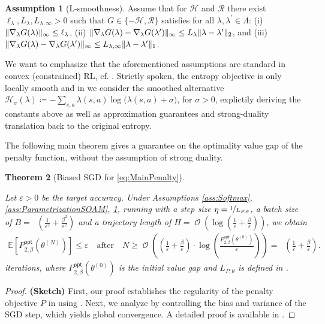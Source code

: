 \documentclass{article}
\theoremstyle{plain}
\newtheorem{theorem}{Theorem}[section]
\theoremstyle{definition}
\newtheorem{assumption}[theorem]{Assumption}
\theoremstyle{remark}
\DeclareMathOperator{\OOTildeSym}{\widetilde{\mathcal{O}}}
\DeclareMathOperator{\OOSym}{\mathcal{O}}
\newcommand{\OOTilde}[1]{{\OOTildeSym\!\left(#1\right)}}
\newcommand{\OO}[1]{{\OOSym\!\left(#1\right)}}
\def\epsilon{{\varepsilon}}
\newcommand{\Exp}[1]{{ \mathbb{E}}\!\left[#1\right]}
\DeclarePairedDelimiter{\norm}{\lVert}{\rVert}
\newcommand{\define}{\coloneqq}
\def\xx{{\theta}}
\def\xxZero{\xx^{(0)}}
\def\xxN{\xx^{(N)}}
\def\optLabel{\mathsf{opt}}
\newcommand{\penOpt}[1]{P^\optLabel_{#1}}
\def\ss{{s}}
\def\HH{{\mathcal{H}}}
\def\aa{{a}}
\def\ss{{s}}
\def\Reg{{\mathcal{R}}}
\begin{document}
\begin{assumption}[L-smoothness]
 \label{ass:Lsmoothness}
 Assume that for $\HH$ and $\Reg$ there exist
 $\ell_\lambda, L_\lambda, L_{\lambda, \infty} > 0$
 such that $G \in \{-\HH, \Reg\}$ satisfies for
 all $\lambda, \lambda^\prime \in \Lambda$:
 (i) $\norm{\nabla_\lambda G(\lambda)}_{\infty} \leq \ell_\lambda$,
 (ii) $\norm{\nabla_{\lambda} G(\lambda) - \nabla_\lambda G(\lambda^\prime)}_{\infty}
  \leq L_\lambda \norm{\lambda - \lambda^\prime}_2$, and
 (iii) $\norm{\nabla_{\lambda} G(\lambda) - \nabla_\lambda G(\lambda^\prime)}_{\infty}
  \leq L_{\lambda, \infty} \norm{\lambda - \lambda^\prime}_1$.
\end{assumption}
We want to emphasize that the aforementioned assumptions are
standard in convex (constrained) RL,
cf. \cite{hazanProvablyEfficientMaximum2019,
 zhangConvergenceSampleEfficiency2021,
 barakatReinforcementLearningGeneral2023a,
 yingPolicybasedPrimalDualMethods2025,
 barakatScalableGeneralUtility2025}.
Strictly spoken, the entropy objective is only locally smooth
\cite{hazanProvablyEfficientMaximum2019,
 zhangConvergenceSampleEfficiency2021}
and in  we consider
the smoothed alternative $\HH_\sigma(\lambda)
 \define-\sum_{\ss,\aa}\lambda(\ss,\aa)
 \log\bigl(\lambda(\ss,\aa)+\sigma\bigr)$, for $\sigma > 0$, explictily
deriving the constants above as well as approximation guarantees
and strong-duality translation back to the original
entropy.


The following main theorem gives a guarantee on the optimality value gap of
the penalty function, without the assumption of strong duality.
\begin{theorem}[Biased SGD for \eqref{eq:MainPenalty}]
 \label{thm:MainResultPenalty}

 Let $\epsilon > 0$ be the target accuracy. Under Assumptions
 \ref{ass:Softmax}, \ref{ass:ParametrizationSOAM}, \ref{ass:Lsmoothness},
 running  with a step size $\eta =
  \nicefrac{1}{L_{P,\theta}}$, a batch size of $B =
  \OOTilde{\frac{1}{\epsilon^2} + \frac{\beta^2}{\epsilon^2}}$ and a
 trajectory length of $H = \OO{\log \left(\frac{1}{\epsilon} +
   \frac{\beta}{\epsilon}\right)}$, we obtain
 \begin{align*}
  \Exp{\penOpt{2, \beta}(\xxN)}
  \leq \epsilon
  \quad \text{after} \quad
  N \geq \OO{\left(\frac{1}{\epsilon} + \frac{\beta}{\epsilon}\right) \cdot
   \log\left(\frac{ \penOpt{2, \beta}(\xxZero) }{\epsilon}\right)} = \OOTilde{
   \frac{1}{\epsilon} + \frac{\beta}{\epsilon} }.
 \end{align*}
 iterations, where $\penOpt{2, \beta}(\xxZero)$ is the initial value gap and
 $L_{P,\theta}$ is defined in .
\end{theorem}
\begin{proof}\textbf{(Sketch)}
 First, our proof establishes the regularity of the penalty objective
 $P$ in  using
 . Next, we analyze  by controlling
 the bias and variance of the SGD step, which yields global convergence.
 A detailed proof is available in .
\end{proof}
\end{document}

